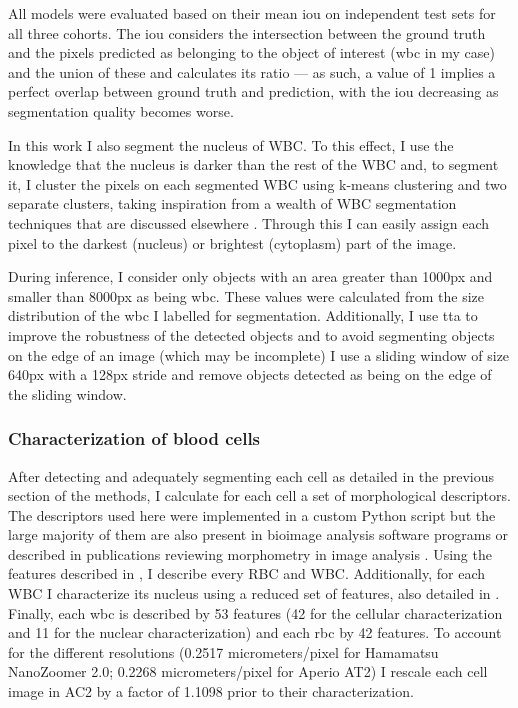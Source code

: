 All models were evaluated based on their mean \ac{iou} on independent test sets for all three cohorts. The \ac{iou} considers the intersection between the ground truth and the pixels predicted as belonging to the object of interest (\ac{wbc} in my case) and the union of these and calculates its ratio --- as such, a value of 1 implies a perfect overlap between ground truth and prediction, with the \ac{iou} decreasing as segmentation quality becomes worse.

In this work I also segment the nucleus of WBC. To this effect, I use the knowledge that the nucleus is darker than the rest of the WBC and, to segment it, I cluster the pixels on each segmented WBC using k-means clustering and two separate clusters, taking inspiration from a wealth of WBC segmentation techniques that are discussed elsewhere \cite{Andrade2019-qv}. Through this I can easily assign each pixel to the darkest (nucleus) or brightest (cytoplasm) part of the image.

During inference, I consider only objects with an area greater than 1000px and smaller than 8000px as being \ac{wbc}. These values were calculated from the size distribution of the \ac{wbc} I labelled for segmentation. Additionally, I use \ac{tta} to improve the robustness of the detected objects and to avoid segmenting objects on the edge of an image (which may be incomplete) I use a sliding window of size 640px with a 128px stride and remove objects detected as being on the edge of the sliding window. 

\subsubsection{Characterization of blood cells}

After detecting and adequately segmenting each cell as detailed in the previous section of the methods, I calculate for each cell a set of morphological descriptors. The descriptors used here were implemented in a custom Python script but the large majority of them are also present in bioimage analysis software programs \cite{Carpenter2006-hy,Sommer2011-ds} or described in publications reviewing morphometry in image analysis \cite{Mingqiang2008-wv}. Using the features described in , I describe every RBC and WBC. Additionally, for each WBC I characterize its nucleus using a reduced set of features, also detailed in . Finally, each \ac{wbc} is described by 53 features (42 for the cellular characterization and 11 for the nuclear characterization) and each \ac{rbc} by 42 features. To account for the different resolutions (0.2517 micrometers/pixel for Hamamatsu NanoZoomer 2.0; 0.2268 micrometers/pixel for Aperio AT2) I rescale each cell image in AC2 by a factor of 1.1098 prior to their characterization.

